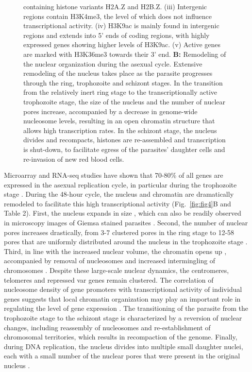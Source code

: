 \begin{figure}
{ containing histone variants H2A.Z and H2B.Z. (iii) Intergenic regions contain
 H3K4me3, the level of which does not influence transcriptional activity. (iv)
 H3K9ac is mainly found in intergenic regions and extends into 5’ ends of
 coding regions, with highly expressed genes showing higher levels of H3K9ac.
 (v) Active genes are marked with H3K36me3 towards their 3’ end. \textbf{B:}
 Remodeling
 of the nuclear organization during the asexual cycle. Extensive remodeling of
 the nucleus takes place as the parasite progresses through the ring,
 trophozoite and schizont stages. In the transition from the relatively inert
 ring stage to the transcriptionally active trophozoite stage, the size of the
 nucleus and the number of nuclear pores increase, accompanied by a decrease
 in genome-wide nucleosome levels, resulting in an open chromatin structure
 that allows high transcription rates. In the schizont stage, the nucleus
 divides and recompacts, histones are re-assembled and transcription is
 shut-down, to facilitate egress of the parasites’ daughter cells and
 re-invasion of new red blood cells.}
\end{figure}

Microarray and RNA-seq studies have shown that 70-80\% of all genes are
expressed in the asexual replication cycle, in particular during the
trophozoite stage \citep{bunnik:polysome, leroch:discovery, otto:new}.
During the 48-hour cycle, the nucleus and
chromatin are dramatically remodeled to facilitate this high transcriptional
activity (Fig.~\ref{fig:fig4}B and Table 2). First, the nucleus expands in size
\citep{weiner:3d}, which
can also be readily observed in microscopy images of Giemsa stained parasites
\citep{ay:three-dimensional}. Second, the number of nuclear pores increases 
drastically, from 3-7
clustered pores in the ring stage to 12-58 pores that are uniformly
distributed around the nucleus in the trophozoite stage \citep{weiner:3d}.
Third, in line
with the increased nuclear volume, the chromatin opens up
\citep{ay:three-dimensional, weiner:3d}, accompanied
by removal of nucleosomes \citep{bunnik:DNA-encoded, ponts:nucleosome}
 and increased intermingling of chromosomes
\citep{ay:three-dimensional}. Despite these large-scale nuclear dynamics, the centromeres, telomeres
and repressed var genes remain clustered. The correlation of nucleosome
density of gene promoters with transcriptional activity of individual genes
suggests that local chromatin organization may play an important role in
regulating the level of gene expression \citep{bunnik:DNA-encoded}. The transitioning of the
parasite from the trophozoite stage to the schizont stage is characterized by
a reversion of nuclear changes, including reassembly of nucleosomes and
re-establishment of chromosomal territories, which results in recompaction of
the genome. Finally, during DNA replication, the nucleus divides into multiple
small daughter nuclei, each with a small number of the nuclear pores that were
present in the original nucleus \citep{weiner:3d}.

